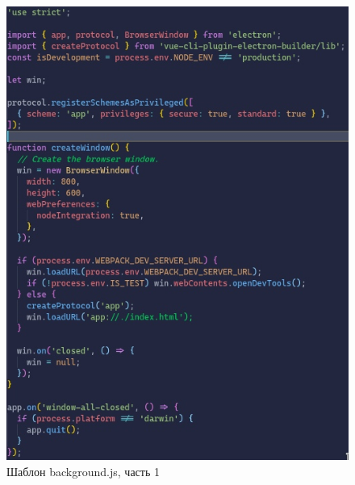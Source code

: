 \begin{figure}[H]
  \centering
  \includegraphics[height=0.4\textheight]{TexModules/pics/backPT1.jpg}
  \caption{Шаблон background.js, часть 1}
  \label{img:backPT1}
\end{figure}

